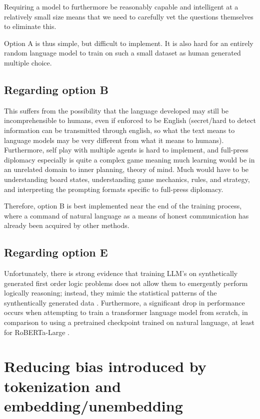 \documentclass{article}
\begin{document}
Requiring a model to furthermore be reasonably capable and intelligent at a relatively small size means that we need to carefully vet the questions themselves to eliminate this.

Option A is thus simple, but difficult to implement. It is also hard for an entirely random language model to train on such a small dataset as human generated multiple choice.


\subsection{Regarding option B}

This suffers from the possibility that the language developed may still be incomprehensible to humans, even if enforced to be English (secret/hard to detect information can be transmitted through english, so what the text means to language models may be very different from what it means to humans). Furthermore, self play with multiple agents is hard to implement, and full-press diplomacy especially is quite a complex game meaning much learning would be in an unrelated domain to inner planning, theory of mind. Much would have to be understanding board states, understanding game mechanics, rules, and strategy, and interpreting the prompting formats specific to full-press diplomacy.

Therefore, option B is best implemented near the end of the training process, where a command of natural language as a means of honest communication has already been acquired by other methods.

\subsection{Regarding option E}

Unfortunately, there is strong evidence that training LLM's on synthetically generated first order logic problems does not allow them to emergently perform logically reasoning; instead, they mimic the statistical patterns of the synthentically generated data \citep{pirozelli2023assessing}. Furthermore, a significant drop in performance occurs when attempting to train a transformer language model from scratch, in comparison to using a pretrained checkpoint trained on natural language, at least for RoBERTa-Large \citep{han2022folio}.

\section{Reducing bias introduced by tokenization and embedding/unembedding}
\end{document}
